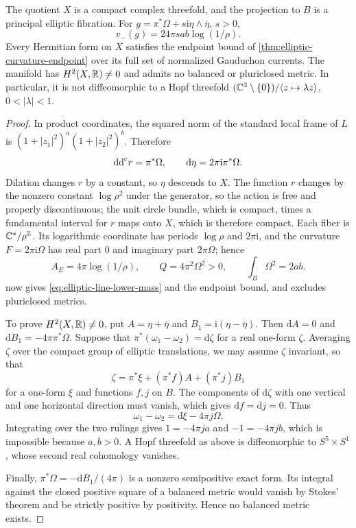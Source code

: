 \begin{proposition}\label{prop:elliptic-line-endpoint-example}
The quotient $X$ is a compact complex threefold, and the projection to $B$ is a principal elliptic fibration. For $g=\pi^*\Omega+s\mathrm i\eta\wedge\bar\eta$, $s>0$,
\begin{equation}\label{eq:elliptic-line-lower-mass}
 v_-(g)=24\pi s ab\log(1/\rho).
\end{equation}
Every Hermitian form on $X$ satisfies the endpoint bound of \cref{thm:elliptic-curvature-endpoint} over its full set of normalized Gauduchon currents. The manifold has $H^2(X,\mathbb R)\ne0$ and admits no balanced or pluriclosed metric. In particular, it is not diffeomorphic to a Hopf threefold $(\mathbb C^3\setminus\{0\})/\langle z\mapsto\lambda z\rangle$, $0<|\lambda|<1$.
\end{proposition}
\begin{proof}
In product coordinates, the squared norm of the standard local frame of $L$ is $(1+|z_1|^2)^a(1+|z_2|^2)^b$. Therefore
\[
 \mathrm{dd}^{\mathrm{c}} r=\pi^*\Omega,\qquad \mathrm d\eta=2\pi\mathrm i\pi^*\Omega.
\]
Dilation changes $r$ by a constant, so $\eta$ descends to $X$. The function $r$ changes by the nonzero constant $\log\rho^2$ under the generator, so the action is free and properly discontinuous; the unit circle bundle, which is compact, times a fundamental interval for $r$ maps onto $X$, which is therefore compact. Each fiber is $\mathbb C^*/\rho^{\mathbb Z}$. Its logarithmic coordinate has periods $\log\rho$ and $2\pi\mathrm i$, and the curvature $F=2\pi\mathrm i\Omega$ has real part $0$ and imaginary part $2\pi\Omega$; hence
\[
 A_E=4\pi\log(1/\rho),\qquad Q=4\pi^2\Omega^2>0,
 \qquad\int_B\Omega^2=2ab.
\]
 now gives \eqref{eq:elliptic-line-lower-mass} and the endpoint bound, and excludes pluriclosed metrics.

To prove $H^2(X,\mathbb R)\ne0$, put $A=\eta+\bar\eta$ and $B_1=\mathrm i(\eta-\bar\eta)$. Then $\mathrm dA=0$ and $\mathrm dB_1=-4\pi\pi^*\Omega$. Suppose that $\pi^*(\omega_1-\omega_2)=\mathrm d\zeta$ for a real one-form $\zeta$. Averaging $\zeta$ over the compact group of elliptic translations, we may assume $\zeta$ invariant, so that
\[
 \zeta=\pi^*\xi+(\pi^*f)A+(\pi^*j)B_1
\]
for a one-form $\xi$ and functions $f,j$ on $B$. The components of $\mathrm d\zeta$ with one vertical and one horizontal direction must vanish, which gives $\mathrm df=\mathrm dj=0$. Thus
\[
 \omega_1-\omega_2=\mathrm d\xi-4\pi j\Omega.
\]
Integrating over the two rulings gives $1=-4\pi ja$ and $-1=-4\pi jb$, which is impossible because $a,b>0$. A Hopf threefold as above is diffeomorphic to $S^5\times S^1$, whose second real cohomology vanishes.

Finally, $\pi^*\Omega=-\mathrm dB_1/(4\pi)$ is a nonzero semipositive exact form. Its integral against the closed positive square of a balanced metric would vanish by Stokes' theorem and be strictly positive by positivity. Hence no balanced metric exists.
\end{proof}
